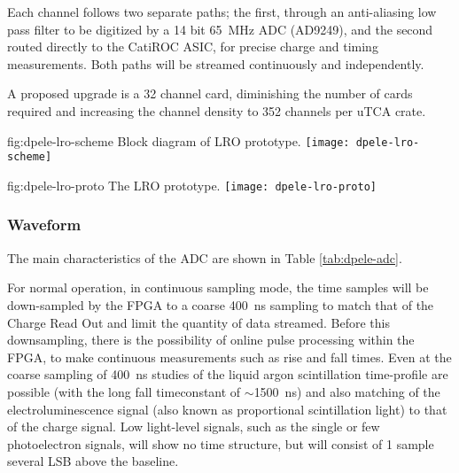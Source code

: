 Each channel follows two separate paths; the first, through an anti-aliasing low pass filter to be digitized by a \num{14} bit \SI{65}{\MHz} ADC (AD9249), and the second routed directly to the CatiROC ASIC, for precise charge and timing measurements. Both paths will be streamed continuously and independently.

A proposed upgrade is a \num{32} channel card, diminishing the number of cards required and increasing the channel density to 352 channels per uTCA crate.

\begin{dunefigure}{fig:dpele-lro-scheme}
{Block diagram of LRO prototype.}
\texttt{[image: dpele-lro-scheme]}
\end{dunefigure}

\begin{dunefigure}{fig:dpele-lro-proto}
{The LRO prototype.}
\texttt{[image: dpele-lro-proto]}
\end{dunefigure}

\subsubsection{Waveform} %
The main characteristics of the ADC are shown in Table \ref{tab:dpele-adc}.

For normal operation, in continuous sampling mode, the time samples will be down-sampled by the FPGA to a coarse \SI{400}{ns} sampling to match that of the Charge Read Out and limit the quantity of data streamed. Before this downsampling, there is the possibility of online pulse processing within the FPGA, to make continuous measurements such as rise and fall times. Even at the coarse sampling of \SI{400}{ns} studies of the liquid argon scintillation time-profile are possible (with the long fall timeconstant of $\sim$\SI{1500}{ns}) and also matching of the electroluminescence signal (also known as proportional scintillation light) to that of the charge signal.  Low light-level signals, such as the single or few photoelectron signals, will show no time structure, but will consist of 1 sample several LSB above the baseline. %


